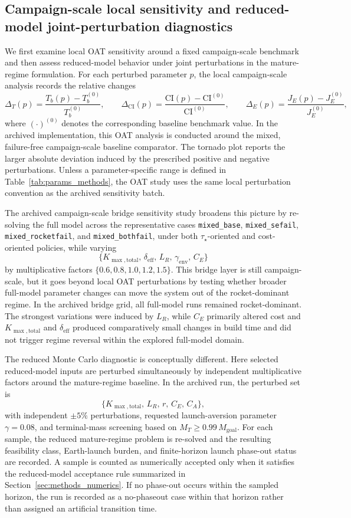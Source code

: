 \documentclass[12pt]{article}
\begin{document}
\subsection{Campaign-scale local sensitivity and reduced-model joint-perturbation diagnostics}
\label{subsec:tornado_mc}

We first examine local OAT sensitivity around a fixed campaign-scale benchmark and then assess reduced-model behavior under joint perturbations in the mature-regime formulation. For each perturbed parameter \(p\), the local campaign-scale analysis records the relative changes
\[
\Delta_T(p)=\frac{T_b(p)-T_b^{(0)}}{T_b^{(0)}},\qquad
\Delta_{\mathrm{CI}}(p)=\frac{\mathrm{CI}(p)-\mathrm{CI}^{(0)}}{\mathrm{CI}^{(0)}},\qquad
\Delta_E(p)=\frac{J_E(p)-J_E^{(0)}}{J_E^{(0)}},
\]
where \((\cdot)^{(0)}\) denotes the corresponding baseline benchmark value. In the archived implementation, this OAT analysis is conducted around the mixed, failure-free campaign-scale baseline comparator. The tornado plot reports the larger absolute deviation induced by the prescribed positive and negative perturbations. Unless a parameter-specific range is defined in Table~\ref{tab:params_methods}, the OAT study uses the same local perturbation convention as the archived sensitivity batch.

The archived campaign-scale bridge sensitivity study broadens this picture by re-solving the full model across the representative cases \texttt{mixed\_base}, \texttt{mixed\_sefail}, \texttt{mixed\_rocketfail}, and \texttt{mixed\_bothfail}, under both \(\tau_\star\)-oriented and cost-oriented policies, while varying
\[
\{K_{\max,\mathrm{total}},\,\delta_{\mathrm{eff}},\,L_R,\,\gamma_{\mathrm{env}},\,C_E\}
\]
by multiplicative factors \(\{0.6,0.8,1.0,1.2,1.5\}\). This bridge layer is still campaign-scale, but it goes beyond local OAT perturbations by testing whether broader full-model parameter changes can move the system out of the rocket-dominant regime. In the archived bridge grid, all full-model runs remained rocket-dominant. The strongest variations were induced by \(L_R\), while \(C_E\) primarily altered cost and \(K_{\max,\mathrm{total}}\) and \(\delta_{\mathrm{eff}}\) produced comparatively small changes in build time and did not trigger regime reversal within the explored full-model domain.

The reduced Monte Carlo diagnostic is conceptually different. Here selected reduced-model inputs are perturbed simultaneously by independent multiplicative factors around the mature-regime baseline. In the archived run, the perturbed set is
\[
\{K_{\max,\mathrm{total}},\,L_R,\,r,\,C_E,\,C_A\},
\]
with independent \(\pm 5\%\) perturbations, requested launch-aversion parameter \(\gamma=0.08\), and terminal-mass screening based on \(M_T \ge 0.99\,M_{\mathrm{goal}}\). For each sample, the reduced mature-regime problem is re-solved and the resulting feasibility class, Earth-launch burden, and finite-horizon launch phase-out status are recorded. A sample is counted as numerically accepted only when it satisfies the reduced-model acceptance rule summarized in Section~\ref{sec:methods_numerics}. If no phase-out occurs within the sampled horizon, the run is recorded as a no-phaseout case within that horizon rather than assigned an artificial transition time.
\end{document}

